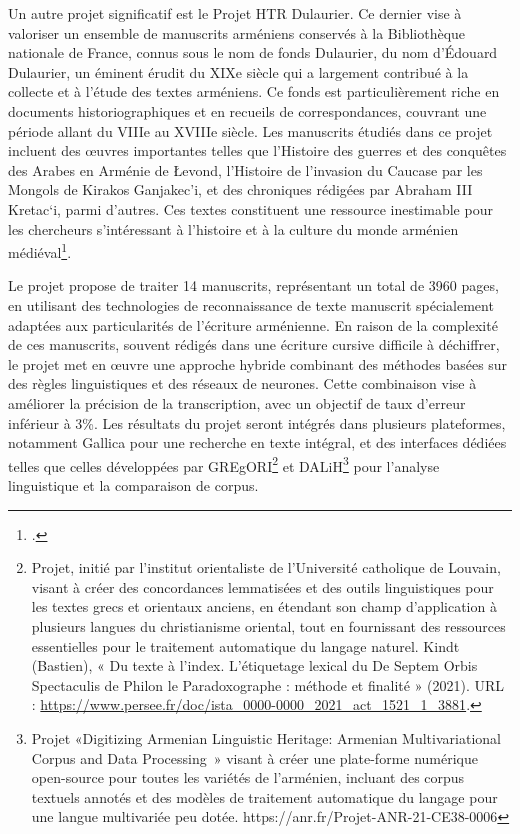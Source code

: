 \documentclass[a4paper,12pt,twoside]{book}
\begin{document}
	Un autre projet significatif est le Projet HTR Dulaurier. Ce dernier vise  à valoriser un ensemble de manuscrits arméniens conservés à la Bibliothèque nationale de France, connus sous le nom de fonds Dulaurier, du nom d’Édouard Dulaurier, un éminent érudit du XIXe siècle qui a largement contribué à la collecte et à l’étude des textes arméniens. Ce fonds est particulièrement riche en documents historiographiques et en recueils de correspondances, couvrant une période allant du VIIIe au XVIIIe siècle. Les manuscrits étudiés dans ce projet incluent des œuvres importantes telles que l’Histoire des guerres et des conquêtes des Arabes en Arménie de Łevond, l’Histoire de l’invasion du Caucase par les Mongols de Kirakos Ganjakec’i, et des chroniques rédigées par Abraham III Kretac‘i, parmi d’autres. Ces textes constituent une ressource inestimable pour les chercheurs s’intéressant à l’histoire et à la culture du monde arménien médiéval\footcite{coulie_valorisation_2022}.
	
	Le projet propose de traiter 14 manuscrits, représentant un total de 3960 pages, en utilisant des technologies de reconnaissance de texte manuscrit spécialement adaptées aux particularités de l’écriture arménienne. En raison de la complexité de ces manuscrits, souvent rédigés dans une écriture cursive difficile à déchiffrer, le projet met en œuvre une approche hybride combinant des méthodes basées sur des règles linguistiques et des réseaux de neurones. Cette combinaison vise à améliorer la précision de la transcription, avec un objectif de taux d’erreur inférieur à 3\%. Les résultats du projet seront intégrés dans plusieurs plateformes, notamment Gallica pour une recherche en texte intégral, et des interfaces dédiées telles que celles développées par GREgORI\footnote{Projet, initié par l’institut orientaliste de l’Université catholique de Louvain, visant à créer des concordances lemmatisées et des outils linguistiques pour les textes grecs et orientaux anciens, en étendant son champ d’application à plusieurs langues du christianisme oriental, tout en fournissant des ressources essentielles pour le traitement automatique du langage naturel. Kindt (Bastien), « Du texte à l’index. L’étiquetage lexical du De Septem Orbis Spectaculis de Philon le Paradoxographe : méthode et finalité » (2021). URL : \url{https://www.persee.fr/doc/ista_0000-0000_2021_act_1521_1_3881}.} et DALiH\footnote{ Projet «Digitizing Armenian Linguistic Heritage: Armenian Multivariational Corpus and Data Processing » visant à créer une plate-forme numérique open-source pour toutes les variétés de l’arménien, incluant des corpus textuels annotés et des modèles de traitement automatique du langage pour une langue multivariée peu dotée. https://anr.fr/Projet-ANR-21-CE38-0006} pour l’analyse linguistique et la comparaison de corpus.
	\\
	
\end{document}
